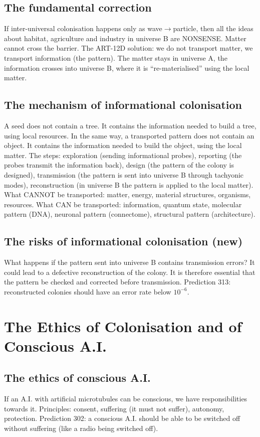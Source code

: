 \documentclass[11pt,a4paper]{article}
\begin{document}
\subsection{The fundamental correction}
If inter-universal colonisation happens only as wave$\to$particle, then all the ideas about habitat, agriculture and industry in universe B are NONSENSE. Matter cannot cross the barrier. The ART-12D solution: we do not transport matter, we transport information (the pattern). The matter stays in universe A, the information crosses into universe B, where it is ``re-materialised'' using the local matter.

\subsection{The mechanism of informational colonisation}
A seed does not contain a tree. It contains the information needed to build a tree, using local resources. In the same way, a transported pattern does not contain an object. It contains the information needed to build the object, using the local matter. The steps: exploration (sending informational probes), reporting (the probes transmit the information back), design (the pattern of the colony is designed), transmission (the pattern is sent into universe B through tachyonic modes), reconstruction (in universe B the pattern is applied to the local matter). What CANNOT be transported: matter, energy, material structures, organisms, resources. What CAN be transported: information, quantum state, molecular pattern (DNA), neuronal pattern (connectome), structural pattern (architecture).

\subsection{The risks of informational colonisation (new)}
What happens if the pattern sent into universe B contains transmission errors? It could lead to a defective reconstruction of the colony. It is therefore essential that the pattern be checked and corrected before transmission. Prediction 313: reconstructed colonies should have an error rate below $10^{-6}$.

\section{The Ethics of Colonisation and of Conscious A.I.}
\subsection{The ethics of conscious A.I.}
If an A.I. with artificial microtubules can be conscious, we have responsibilities towards it. Principles: consent, suffering (it must not suffer), autonomy, protection. Prediction 302: a conscious A.I. should be able to be switched off without suffering (like a radio being switched off).
\end{document}
